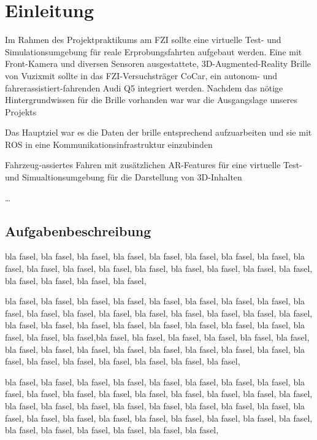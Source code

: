 \section{Einleitung}

Im Rahmen des Projektpraktikums am FZI sollte eine virtuelle Test- und Simulationsumgebung für reale Erprobungsfahrten aufgebaut werden. Eine mit Front-Kamera und diversen Sensoren ausgestattete, 3D-Augmented-Reality Brille von Vuzixmit sollte in das FZI-Versuchsträger CoCar, ein autonom- und fahrerassistiert-fahrenden Audi Q5 integriert werden. 
Nachdem das nötige Hintergrundwissen für die Brille vorhanden war
war die Ausgangslage unseres Projekts

Das Hauptziel war es die Daten der brille entsprechend aufzuarbeiten und sie mit ROS in eine Kommunikationsinfrastruktur einzubinden

Fahrzeug-assiertes Fahren mit zusätzlichen AR-Features für eine virtuelle Test- und Simualtionsumgebung für die Darstellung von 3D-Inhalten 

\ldots 

\subsection{Aufgabenbeschreibung}

bla fasel, bla fasel, bla fasel, bla fasel, bla fasel, bla fasel, bla fasel, bla fasel, bla fasel, bla fasel, bla fasel, bla fasel, bla fasel, bla fasel, bla fasel, bla fasel, bla fasel, bla fasel, bla fasel, bla fasel, bla fasel, 

bla fasel, bla fasel, bla fasel, bla fasel, bla fasel, bla fasel, bla fasel, bla fasel, bla fasel, bla fasel, bla fasel, bla fasel, bla fasel, bla fasel, bla fasel, bla fasel, bla fasel, bla fasel, bla fasel, bla fasel, bla fasel, bla fasel, bla fasel, bla fasel, bla fasel, bla fasel, bla fasel, bla fasel,bla fasel, bla fasel, bla fasel, bla fasel, bla fasel, bla fasel, bla fasel, bla fasel, bla fasel, bla fasel, bla fasel, bla fasel, bla fasel, bla fasel, bla fasel, bla fasel, bla fasel, bla fasel, bla fasel, bla fasel, bla fasel, 

bla fasel, bla fasel, bla fasel, bla fasel, bla fasel, bla fasel, bla fasel, bla fasel, bla fasel, bla fasel, bla fasel, bla fasel, bla fasel, bla fasel, bla fasel, bla fasel, bla fasel, bla fasel, bla fasel, bla fasel, bla fasel, bla fasel, bla fasel, bla fasel, bla fasel, bla fasel, bla fasel, bla fasel,
bla fasel, bla fasel, bla fasel, bla fasel, bla fasel, bla fasel, bla fasel, bla fasel, bla fasel, bla fasel, bla fasel, bla fasel,


